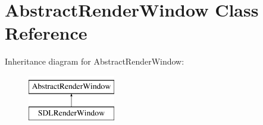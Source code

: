 \hypertarget{classAbstractRenderWindow}{\section{Abstract\-Render\-Window Class Reference}
\label{classAbstractRenderWindow}
}
Inheritance diagram for Abstract\-Render\-Window\-:\begin{figure}[H]
\begin{center}
\leavevmode
\includegraphics[height=2.000000cm]{classAbstractRenderWindow}
\end{center}
\end{figure}
